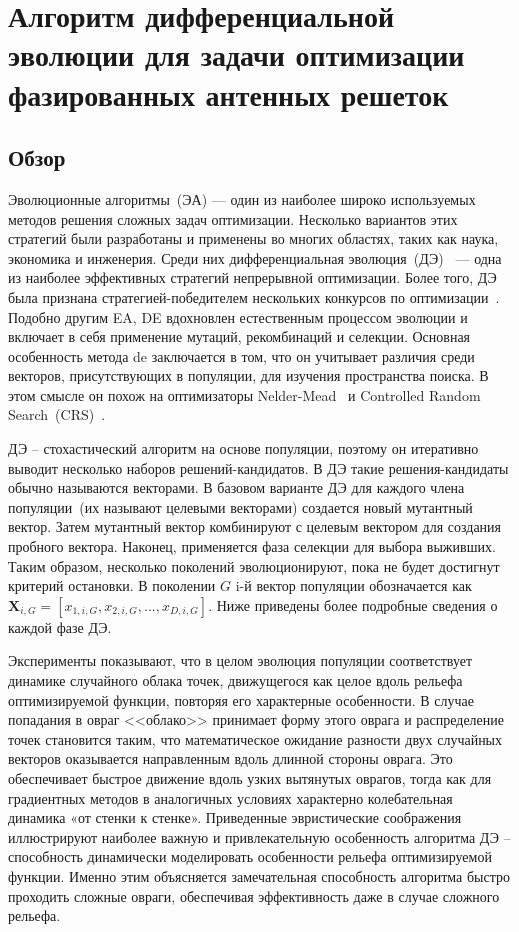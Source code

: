 \chapter{Алгоритм дифференциальной эволюции для задачи оптимизации фазированных антенных решеток}\label{sec:radio}

\section{Обзор}
Эволюционные алгоритмы~(ЭА) — один из наиболее широко используемых методов решения сложных задач оптимизации. Несколько вариантов этих стратегий были разработаны и применены во многих областях, таких как наука, экономика и инженерия. Среди них дифференциальная эволюция~(ДЭ)~\cite{storn:de} — одна из наиболее эффективных стратегий непрерывной оптимизации. Более того, ДЭ была признана стратегией-победителем нескольких конкурсов по оптимизации~\cite{das:de}. Подобно другим EA, DE вдохновлен естественным процессом эволюции и включает в себя применение мутаций, рекомбинаций и селекции. Основная особенность метода de заключается в том, что он учитывает различия среди векторов, присутствующих в популяции, для изучения пространства поиска. В этом смысле он похож на оптимизаторы Nelder-Mead~\cite{nelder:simplex} и Controlled Random Search~(CRS)~\cite{price:global}.

ДЭ -- стохастический алгоритм на основе популяции, поэтому он итеративно выводит несколько наборов решений-кандидатов. В ДЭ такие решения-кандидаты обычно называются векторами. В базовом варианте ДЭ для каждого члена популяции~(их называют целевыми векторами) создается новый мутантный вектор. Затем мутантный вектор комбинируют с целевым вектором для создания пробного вектора. Наконец, применяется фаза селекции для выбора выживших. Таким образом, несколько поколений эволюционируют, пока не будет достигнут критерий остановки. В поколении $G$ i-й вектор популяции обозначается как $\textbf{X}_{i,G} = [x_{1,i,G}, x_{2,i,G}, ..., x_{D,i,G}]$. Ниже приведены более подробные сведения о каждой фазе ДЭ.

Эксперименты показывают, что в целом эволюция популяции соответствует динамике случайного облака точек, движущегося как целое вдоль рельефа оптимизируемой функции, повторяя его характерные особенности. В случае попадания в овраг <<облако>> принимает форму этого оврага и распределение точек становится таким, что математическое ожидание разности двух случайных векторов оказывается направленным вдоль длинной стороны оврага. Это обеспечивает быстрое движение вдоль узких вытянутых оврагов, тогда как для градиентных методов в аналогичных условиях характерно колебательная динамика «от стенки к стенке». Приведенные эвристические соображения иллюстрируют наиболее важную и привлекательную особенность алгоритма ДЭ -- способность динамически моделировать особенности рельефа оптимизируемой функции. Именно этим объясняется замечательная способность алгоритма быстро проходить сложные овраги, обеспечивая эффективность даже в случае сложного рельефа.

